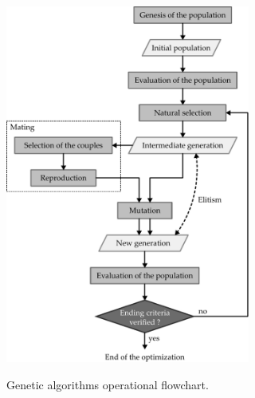 \documentclass{ametsoc}
\begin{document}
\begin{figure}[t]
	\begin{center}
		\noindent\includegraphics[width=19pc,angle=0]{fig02.pdf}\\
	\end{center}
	\caption{Genetic algorithms operational flowchart.}
	\label{fig:structure_gas}
\end{figure}
\end{document}
